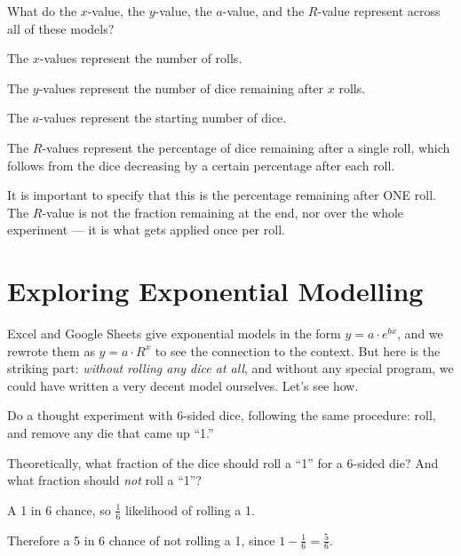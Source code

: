 \documentclass[12pt]{ximera}
\begin{document}
\begin{problem}
What do the $x$-value, the $y$-value, the $a$-value, and the $R$-value represent across
all of these models?

\begin{freeResponse}
\end{freeResponse}

\begin{solution}
The $x$-values represent the number of rolls.

The $y$-values represent the number of dice remaining after $x$ rolls.

The $a$-values represent the starting number of dice.

The $R$-values represent the percentage of dice remaining after a single roll, which
follows from the dice decreasing by a certain percentage after each roll.

It is important to specify that this is the percentage remaining after ONE roll. The
$R$-value is not the fraction remaining at the end, nor over the whole experiment ---
it is what gets applied once per roll.
\end{solution}
\end{problem}

\section*{Exploring Exponential Modelling}

Excel and Google Sheets give exponential models in the form $y = a \cdot e^{bx}$, and we
rewrote them as $y = a \cdot R^x$ to see the connection to the context. But here is the
striking part: \emph{without rolling any dice at all}, and without any special program, we
could have written a very decent model ourselves. Let's see how.

Do a thought experiment with 6-sided dice, following the same procedure: roll, and remove
any die that came up ``1.''

\begin{problem}
Theoretically, what fraction of the dice should roll a ``1'' for a 6-sided die? And what
fraction should \emph{not} roll a ``1''?

\begin{freeResponse}
\end{freeResponse}

\begin{solution}
A 1 in 6 chance, so $\tfrac{1}{6}$ likelihood of rolling a 1.

Therefore a 5 in 6 chance of not rolling a 1, since
$1 - \tfrac{1}{6} = \tfrac{5}{6}$.
\end{solution}
\end{problem}
\end{document}
